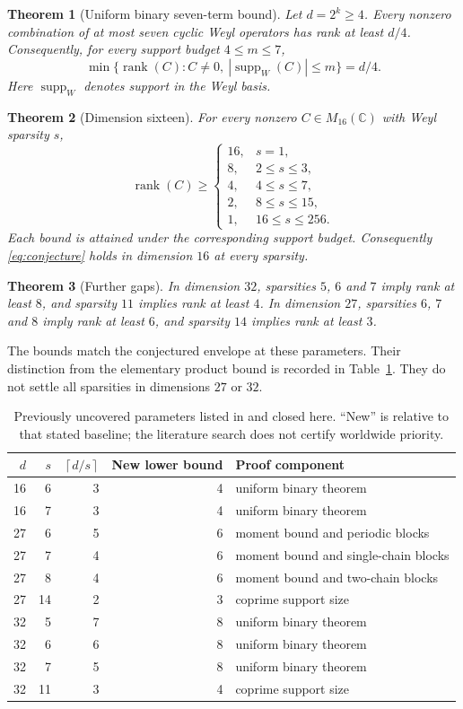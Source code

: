 \documentclass[11pt,a4paper]{article}
\newtheorem{theorem}{Theorem}
\theoremstyle{remark}\newtheorem{remark}[theorem]{Remark}
\DeclareMathOperator{\rank}{rank}
\DeclareMathOperator{\supp}{supp}
\newcommand{\C}{\mathbb C}
\newcommand{\ceil}[1]{\left\lceil #1\right\rceil}
\begin{document}
\begin{theorem}[Uniform binary seven-term bound]\label{thm:binary}
Let $d=2^k\ge4$. Every nonzero combination of at most seven cyclic Weyl operators has rank at least $d/4$. Consequently, for every support budget $4\le m\le7$,
\[
 \min\{\rank(C):C\ne0,\ |\supp_W(C)|\le m\}=d/4.
\]
Here $\supp_W$ denotes support in the Weyl basis.
\end{theorem}

\begin{theorem}[Dimension sixteen]\label{thm:16}
For every nonzero $C\in M_{16}(\C)$ with Weyl sparsity $s$,
\[
\rank(C)\ge
\begin{cases}
16,&s=1,\\
8,&2\le s\le3,\\
4,&4\le s\le7,\\
2,&8\le s\le15,\\
1,&16\le s\le256.
\end{cases}
\]
Each bound is attained under the corresponding support budget. Consequently \eqref{eq:conjecture} holds in dimension $16$ at every sparsity.
\end{theorem}

\begin{theorem}[Further gaps]\label{thm:further}
In dimension $32$, sparsities $5$, $6$ and $7$ imply rank at least $8$, and sparsity $11$ implies rank at least $4$. In dimension $27$, sparsities $6$, $7$ and $8$ imply rank at least $6$, and sparsity $14$ implies rank at least $3$.
\end{theorem}

The bounds match the conjectured envelope at these parameters. Their distinction from the elementary product bound is recorded in Table~\ref{tab:bounds}. They do not settle all sparsities in dimensions $27$ or $32$.

\begin{table}[ht]
\centering
\begin{tabular}{@{}rrrrl@{}}
\toprule
$d$ & $s$ & $\ceil{d/s}$ & New lower bound & Proof component\\
\midrule
16&6&3&4&uniform binary theorem\\
16&7&3&4&uniform binary theorem\\
27&6&5&6&moment bound and periodic blocks\\
27&7&4&6&moment bound and single-chain blocks\\
27&8&4&6&moment bound and two-chain blocks\\
27&14&2&3&coprime support size\\
32&5&7&8&uniform binary theorem\\
32&6&6&8&uniform binary theorem\\
32&7&5&8&uniform binary theorem\\
32&11&3&4&coprime support size\\
\bottomrule
\end{tabular}
\caption{Previously uncovered parameters listed in \cite{prior} and closed here. ``New'' is relative to that stated baseline; the literature search does not certify worldwide priority.}\label{tab:bounds}
\end{table}
\end{document}
